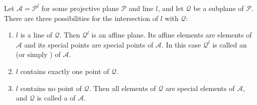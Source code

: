 Let $\mathcal{A} = \mathcal{P}^l$ for some projective plane $\mathcal{P}$ and line $l$, and let $\mathcal{Q}$ be a subplane of $\mathcal{P}$. There are three possibilities for the intersection of $l$ with $\mathcal{Q}$:

\begin{enumerate}
\item[(a)] $l$ is a line of $\mathcal{Q}$. Then $\mathcal{Q}^l$ is an affine plane. Its affine elements are elements of $\mathcal{A}$ and its special points are special points of $\mathcal{A}$. In this case $\mathcal{Q}^l$ is called an  (or simply ) of $\mathcal{A}$.
\item[(b)] $l$ contains exactly one point of $\mathcal{Q}$.
\item[(c)] $l$ contains no point of $\mathcal{Q}$. Then all elements of $\mathcal{Q}$ are special elements of $\mathcal{A}$, and $\mathcal{Q}$ is called a  of $\mathcal{A}$.
\end{enumerate}
